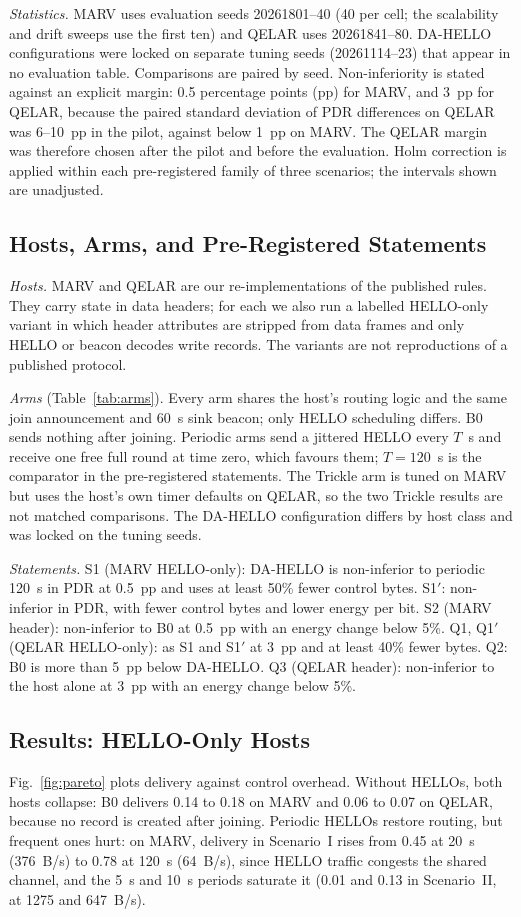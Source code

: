\emph{Statistics.} MARV uses evaluation seeds 20261801--40 (40 per cell; the scalability and drift sweeps use the first ten) and QELAR uses 20261841--80. DA-HELLO configurations were locked on separate tuning seeds (20261114--23) that appear in no evaluation table. Comparisons are paired by seed. Non-inferiority is stated against an explicit margin: 0.5 percentage points (pp) for MARV, and 3~pp for QELAR, because the paired standard deviation of PDR differences on QELAR was 6--10~pp in the pilot, against below 1~pp on MARV. The QELAR margin was therefore chosen after the pilot and before the evaluation. Holm correction is applied within each pre-registered family of three scenarios; the intervals shown are unadjusted.

\subsection{Hosts, Arms, and Pre-Registered Statements}
\label{sec:arms}
\emph{Hosts.} MARV and QELAR are our re-implementations of the published rules. They carry state in data headers; for each we also run a labelled HELLO-only variant in which header attributes are stripped from data frames and only HELLO or beacon decodes write records. The variants are not reproductions of a published protocol.

\emph{Arms} (Table~\ref{tab:arms}). Every arm shares the host's routing logic and the same join announcement and 60~s sink beacon; only HELLO scheduling differs. B0 sends nothing after joining. Periodic arms send a jittered HELLO every $T$~s and receive one free full round at time zero, which favours them; $T=120$~s is the comparator in the pre-registered statements. The Trickle arm is tuned on MARV but uses the host's own timer defaults on QELAR, so the two Trickle results are not matched comparisons. The DA-HELLO configuration differs by host class and was locked on the tuning seeds.

\emph{Statements.} S1 (MARV HELLO-only): DA-HELLO is non-inferior to periodic 120~s in PDR at 0.5~pp and uses at least 50\% fewer control bytes. S1$'$: non-inferior in PDR, with fewer control bytes and lower energy per bit. S2 (MARV header): non-inferior to B0 at 0.5~pp with an energy change below 5\%. Q1, Q1$'$ (QELAR HELLO-only): as S1 and S1$'$ at 3~pp and at least 40\% fewer bytes. Q2: B0 is more than 5~pp below DA-HELLO. Q3 (QELAR header): non-inferior to the host alone at 3~pp with an energy change below 5\%.


\subsection{Results: HELLO-Only Hosts}
\label{sec:res-hello}
Fig.~\ref{fig:pareto} plots delivery against control overhead. Without HELLOs, both hosts collapse: B0 delivers 0.14 to 0.18 on MARV and 0.06 to 0.07 on QELAR, because no record is created after joining. Periodic HELLOs restore routing, but frequent ones hurt: on MARV, delivery in Scenario~I rises from 0.45 at 20~s (376~B/s) to 0.78 at 120~s (64~B/s), since HELLO traffic congests the shared channel, and the 5~s and 10~s periods saturate it (0.01 and 0.13 in Scenario~II, at 1275 and 647~B/s).

